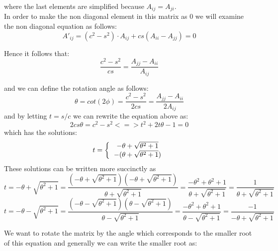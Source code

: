 \documentclass[12pt,twoside]{article}
\begin{document}
where the last elements are simplified because $A_{ij}=A_{ji}$.\\



In order to make the non diagonal element in this matrix as 0 we will examine the non diagonal equation as follows:
\begin{equation}
A'_{ij} = (c^2 - s^2) \cdot A_{ij} + cs(A_{ii}-A_{jj}) = 0
\end{equation}


Hence it follows that:
\begin{equation}
\frac{c^2-s^2}{cs} = \frac{A_{jj}-A_{ii}}{A_{ij}}
\end{equation}

and we can define the rotation angle as follows:
\begin{equation}
\theta = cot(2\phi) = \frac{c^2-s^2}{2cs} = \frac{A_{jj}-A_{ii}}{2A_{ij}}
\end{equation}
and by letting $t = s/c$ we can rewrite the equation above as:\\
\begin{equation}
2cs\theta = c^2 - s^2 <=>
t^2 + 2t\theta - 1 = 0
\end{equation}
which has the solutions:\\
\begin{equation}
t = 
\bigg\{
  \begin{tabular}{cc}
$ -\theta + \sqrt{\theta^2+1}$ \\
$ -(\theta + \sqrt{\theta^2+1})$ \\
  \end{tabular}
\end{equation}
These solutions can be written more succinctly as
\begin{equation}
t =  -\theta + \sqrt{\theta^2+1}  = \frac{ \left(-\theta + \sqrt{\theta^2+1}\right)\left(-\theta + \sqrt{\theta^2+1}\right) }{\theta + \sqrt{\theta^2+1}}
= \frac{ -\theta^2 + \theta^2 + 1 }{\theta + \sqrt{\theta^2+1}} = \frac{1}{\theta + \sqrt{\theta^2+1}}
\end{equation}
\begin{equation}
t =  -\theta - \sqrt{\theta^2+1}  = \frac{ \left(-\theta - \sqrt{\theta^2+1}\right)\left(\theta - \sqrt{\theta^2+1}\right) }{\theta - \sqrt{\theta^2+1}}
= \frac{ -\theta^2 + \theta^2 + 1 }{\theta - \sqrt{\theta^2+1}} = \frac{-1}{-\theta + \sqrt{\theta^2+1}}
\end{equation}

We want to rotate the matrix by the angle which corresponds to the smaller root of this equation and generally we can write the smaller root as:
\end{document}
